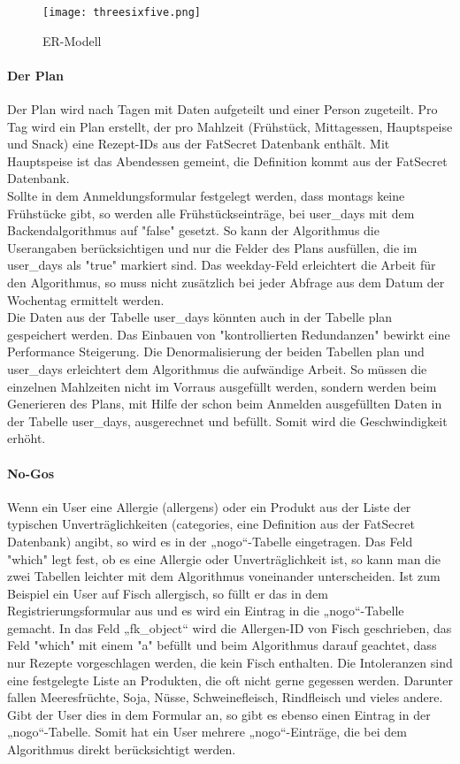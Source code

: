 \begin{figure}[hb]
\centering
\texttt{[image: threesixfive.png]}
\caption{ER-Modell}
\end{figure}

\paragraph{Der Plan}
Der Plan wird nach Tagen mit Daten aufgeteilt und einer Person zugeteilt. Pro Tag wird ein Plan erstellt, der pro Mahlzeit (Frühstück, Mittagessen, Hauptspeise und Snack) eine Rezept-IDs aus der FatSecret Datenbank enthält. Mit Hauptspeise ist das Abendessen gemeint, die Definition kommt aus der FatSecret Datenbank.\\

Sollte in dem Anmeldungsformular festgelegt werden, dass montags keine Frühstücke gibt, so werden alle Frühstückseinträge, bei user\_days mit dem Backendalgorithmus auf "false" gesetzt. So kann der Algorithmus die Userangaben berücksichtigen und nur die Felder des Plans ausfüllen, die im user\_days als "true" markiert sind.  
Das weekday-Feld erleichtert die Arbeit für den Algorithmus, so muss nicht zusätzlich bei jeder Abfrage aus dem Datum der Wochentag ermittelt werden. \\

Die Daten aus der Tabelle user\_days könnten auch in der Tabelle plan gespeichert werden. Das Einbauen von "kontrollierten Redundanzen" bewirkt eine Performance Steigerung. Die Denormalisierung der beiden Tabellen plan und user\_days erleichtert dem Algorithmus die aufwändige Arbeit. So müssen die einzelnen Mahlzeiten nicht im Vorraus ausgefüllt werden, sondern werden beim Generieren des Plans, mit Hilfe der schon beim Anmelden ausgefüllten Daten in der Tabelle user\_days, ausgerechnet und befüllt. Somit wird die Geschwindigkeit erhöht. 

\paragraph{No-Gos}
Wenn ein User eine Allergie (allergens) oder ein Produkt aus der Liste der typischen Unverträglichkeiten (categories, eine Definition aus der FatSecret Datenbank) angibt, so wird es in der „nogo“-Tabelle eingetragen. Das Feld "which" legt fest, ob es eine Allergie oder Unverträglichkeit ist, so kann man die zwei Tabellen leichter mit dem Algorithmus voneinander unterscheiden. Ist zum Beispiel ein User auf Fisch allergisch, so füllt er das in dem Registrierungsformular aus und es wird ein Eintrag in die „nogo“-Tabelle gemacht. In das Feld „fk\_object“  wird die Allergen-ID von Fisch geschrieben, das Feld "which" mit einem "a" befüllt und beim Algorithmus darauf geachtet, dass nur Rezepte vorgeschlagen werden, die kein Fisch enthalten. Die Intoleranzen sind eine festgelegte Liste an Produkten, die oft nicht gerne gegessen werden. Darunter fallen Meeresfrüchte, Soja, Nüsse, Schweinefleisch, Rindfleisch und vieles andere. Gibt der User dies in dem Formular an, so gibt es ebenso einen Eintrag in der „nogo“-Tabelle. Somit hat ein User mehrere „nogo“-Einträge, die bei dem Algorithmus direkt berücksichtigt werden.

